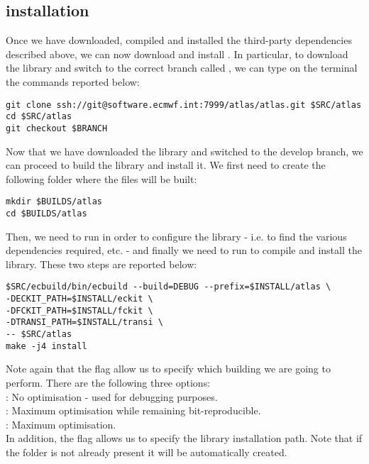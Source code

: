 \subsection{\Atlas installation}
Once we have downloaded, compiled and installed the third-party 
dependencies described above, we can now download and install 
\Atlas. In particular, to download the library and switch 
to the correct branch called , we can type 
on the terminal the commands reported below:
%
\begin{lstlisting}[style=BashStyle]
git clone ssh://git@software.ecmwf.int:7999/atlas/atlas.git $SRC/atlas
cd $SRC/atlas
git checkout $BRANCH
\end{lstlisting}
%
Now that we have downloaded the library and switched 
to the develop branch, we can proceed to build the 
library and install it. We first need to create the 
following folder where the files will be built:
%
\begin{lstlisting}[style=BashStyle]
mkdir $BUILDS/atlas
cd $BUILDS/atlas
\end{lstlisting}
%
Then, we need to run  in order to configure 
the library - i.e. to find the various dependencies required, 
etc. - and finally we need to run  
to compile and install the library. These two steps are 
reported below:
%
\begin{lstlisting}[style=BashStyle]
$SRC/ecbuild/bin/ecbuild --build=DEBUG --prefix=$INSTALL/atlas \ 
-DECKIT_PATH=$INSTALL/eckit \
-DFCKIT_PATH=$INSTALL/fckit \
-DTRANSI_PATH=$INSTALL/transi \
-- $SRC/atlas
make -j4 install
\end{lstlisting}
%
Note again that the flag  allow us to specify 
which building we are going to perform. There are the following 
three options:\\
\hspace{1cm}: No optimisation - used 
for debugging purposes.\\
\hspace{1cm}\inlsh{BIT}: Maximum optimisation while 
remaining bit-reproducible.\\
\hspace{1cm}\inlsh{RELEASE}: Maximum optimisation.\\
In addition, the flag  allows us to 
specify the library installation path. Note that if 
the folder  is not already 
present it will be automatically created.

